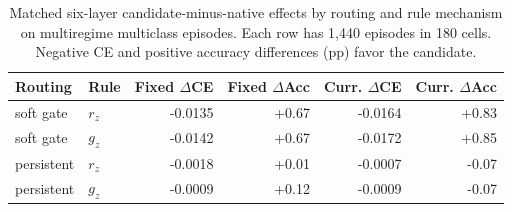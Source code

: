 \begin{table}[t]
\centering\small
\caption{Matched six-layer candidate-minus-native effects by routing and rule mechanism on multiregime multiclass episodes. Each row has 1,440 episodes in 180 cells. Negative CE and positive accuracy differences (pp) favor the candidate.}
\label{tab:mechanism}
\begin{tabular}{@{}llrrrr@{}}\toprule
Routing & Rule & Fixed $\Delta$CE & Fixed $\Delta$Acc & Curr. $\Delta$CE & Curr. $\Delta$Acc\\\midrule
soft gate & $r_z$ & -0.0135 & +0.67 & -0.0164 & +0.83\\
soft gate & $g_z$ & -0.0142 & +0.67 & -0.0172 & +0.85\\
persistent & $r_z$ & -0.0018 & +0.01 & -0.0007 & -0.07\\
persistent & $g_z$ & -0.0009 & +0.12 & -0.0009 & -0.07\\
\bottomrule\end{tabular}
\end{table}
